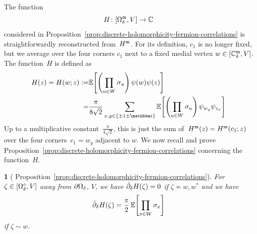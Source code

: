 \documentclass[12pt,oneside,english]{amsart}
\numberwithin{equation}{section}
\numberwithin{figure}{section}
\theoremstyle{plain}
\theoremstyle{plain}
\theoremstyle{plain}
\theoremstyle{plain}
\theoremstyle{remark}
\theoremstyle{definition}
\theoremstyle{plain}
\theoremstyle{plain}
\newtheorem*{prop*}{\protect\propositionname}
\numberwithin{thm}{section}
\newcommand{\kallemod}[1]{{\color{kallecol} {#1}}}
\providecommand{\propositionname}{Proposition}
\providecommand{\propositionname}{Proposition}
\providecommand{\propositionname}{Proposition}
\providecommand{\propositionname}{Proposition}
\begin{document}
The function
\[ H \colon {\left[ {{\Omega}}_{{\delta}}^{\mathfrak{m}}, V \right]} \to  \mathbb{C}\]
considered in
Proposition~\ref{prop:discrete-holomorphicity-fermion-correlations}
is straightforwardly reconstructed from~$H^{\mathfrak{m}}$. For 
its definition, 
$c_1$ is no longer fixed, but we average over the four corners $c_1$ next to a 
fixed medial vertex $w \in {\left[ {\mathbb{C}_{{\delta}}^{\mathfrak{m}}}, V \right]}$. The function~$H$ is defined as
\begin{align*}
H(z) = H(w; z)
:= & \correl{ \left(\prod_{u\in W}\spin_{u}\right)
      \ferm(w) \ferm(z) } \\
  = & \frac{\pi}{8 \sqrt{2}} \sum_{x,y \in \set{\pm 1 \pm \ii}} 
      \correl{ \left(\prod_{u\in W}\spin_{u}\right)
          \ferm_{w_y} \ferm_{z_x} }
\end{align*}
Up to a multiplicative constant~$\frac{\pi}{4\sqrt{2}}$, this is just the sum
of~$H^{\mathfrak{m}}(z)=H^{\mathfrak{m}}(c_1;z)$ over the four corners~$c_1 = w_y$ adjacent to $w$.
We now recall and prove 
Proposition~\ref{prop:discrete-holomorphicity-fermion-correlations} concerning
the function~$H$.
\begin{prop*}[%
Proposition~\ref{prop:discrete-holomorphicity-fermion-correlations}]
For $\zeta \in {\left[ {{\Omega}}_{{\delta}}^{\diamond}, V \right]}$ away from $\partial{{\Omega}}_{{\delta}} $,
$V$, we have
${{\bar{\partial}}}_{{\delta}} H(\zeta) =0$ if $\zeta \not \sim w, w^{*}$
and we have 
\[
{{\bar{\partial}}}_{{\delta}}  H(\zeta) 
= \frac{\pi}{2} \, \mathbb{E} \! \left[ { \prod_{x\in W} {\sigma}_{x} } \right]
\]
if $\zeta\sim w$.
\end{prop*}
\end{document}
